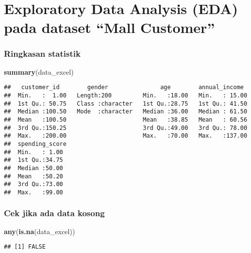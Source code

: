 \documentclass[
]{article}
\newenvironment{Shaded}{\begin{snugshade}}{\end{snugshade}}
\newcommand{\FunctionTok}[1]{\textcolor[rgb]{0.13,0.29,0.53}{\textbf{#1}}}
\newcommand{\NormalTok}[1]{#1}
\begin{document}
\hypertarget{exploratory-data-analysis-eda-pada-dataset-mall-customer}{%
\section{Exploratory Data Analysis (EDA) pada dataset ``Mall
Customer''}\label{exploratory-data-analysis-eda-pada-dataset-mall-customer}}

\hypertarget{ringkasan-statistik}{%
\subsubsection{Ringkasan statistik}\label{ringkasan-statistik}}

\begin{Shaded}
\begin{Highlighting}[]
\FunctionTok{summary}\NormalTok{(data\_excel)}
\end{Highlighting}
\end{Shaded}

\begin{verbatim}
##   customer_id        gender               age        annual_income   
##  Min.   :  1.00   Length:200         Min.   :18.00   Min.   : 15.00  
##  1st Qu.: 50.75   Class :character   1st Qu.:28.75   1st Qu.: 41.50  
##  Median :100.50   Mode  :character   Median :36.00   Median : 61.50  
##  Mean   :100.50                      Mean   :38.85   Mean   : 60.56  
##  3rd Qu.:150.25                      3rd Qu.:49.00   3rd Qu.: 78.00  
##  Max.   :200.00                      Max.   :70.00   Max.   :137.00  
##  spending_score 
##  Min.   : 1.00  
##  1st Qu.:34.75  
##  Median :50.00  
##  Mean   :50.20  
##  3rd Qu.:73.00  
##  Max.   :99.00
\end{verbatim}

\hypertarget{cek-jika-ada-data-kosong}{%
\subsubsection{Cek jika ada data
kosong}\label{cek-jika-ada-data-kosong}}

\begin{Shaded}
\begin{Highlighting}[]
\FunctionTok{any}\NormalTok{(}\FunctionTok{is.na}\NormalTok{(data\_excel))}
\end{Highlighting}
\end{Shaded}

\begin{verbatim}
## [1] FALSE
\end{verbatim}
\end{document}

